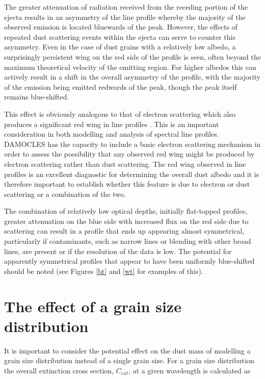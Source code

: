 The greater attenuation of radiation received from the receding portion of 
the ejecta results in an asymmetry of the line profile whereby the 
majority of the observed emission is located bluewards of the peak.  
However, the effects of repeated dust scattering events within the 
ejecta can serve to counter this asymmetry.  Even in the case of dust grains 
with a relatively low albedo, a surprisingly persistent wing on the red 
side of the profile is seen, often beyond the maximum theoretical velocity 
of the emitting region.  For higher albedos this can actively result in a 
shift in the overall asymmetry of the profile, with the majority of the 
emission being emitted redwards of the peak, though the peak itself 
remains blue-shifted.

This effect is obviously analogous to that of electron scattering which 
also produces a significant red wing in line profiles \citep{Hillier1991, 
Auer1972b}. This is an important consideration in both modelling and 
analysis of spectral line profiles.  DAMOCLES has the capacity to include 
a basic electron scattering mechanism in order to assess the possibility 
that any observed red wing might be produced by electron scattering rather 
than dust scattering.  The red wing observed in line profiles is an 
excellent diagnostic for determining the overall dust albedo and it is 
therefore important to establish whether this feature is due to 
electron or dust scattering or a combination of the two.

The combination of relatively low optical depths, initially flat-topped 
profiles, greater attenuation on the blue side with increased flux on the 
red side due to scattering can result in a profile that ends up appearing 
almost symmetrical, particularly if 
contaminants, such as narrow lines or blending with other broad lines, are 
present or if the resolution of the data is low.  The potential for apparently 
symmetrical profiles that appear to have been uniformly blue-shifted 
should be noted (see Figures \ref{bt} and \ref{wt} for examples of this).



\section{The effect of a grain size distribution}
\label{gs_distn}
It is important to consider the potential effect on the dust mass of modelling a grain size distribution instead of a single grain size.  For a grain size distribution the overall extinction cross section, $C_{ext}$, at a given wavelength is calculated as

